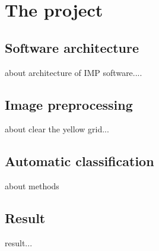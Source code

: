 \chapter{The project}
\section{Software architecture}
about architecture of IMP software....
\section{Image preprocessing}
about clear the yellow grid...
\section{Automatic classification }
about methods
\section{Result}
result...